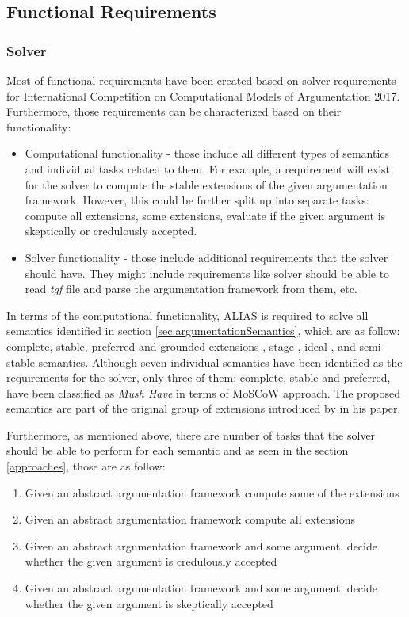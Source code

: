 \subsection{Functional Requirements}

\subsubsection{Solver}

Most of functional requirements have been created based on solver requirements for International Competition on Computational Models of Argumentation 2017. Furthermore, those requirements can be characterized based on their functionality:
\begin{itemize}
	\item Computational functionality - those include all different types of semantics and individual tasks related to them. For example, a requirement will exist for the solver to compute the stable extensions of the given argumentation framework. However, this could be further split up into separate tasks: compute all extensions, some extensions, evaluate if the given argument is skeptically or credulously accepted.
	\item Solver functionality - those include additional requirements that the solver should have. They might include requirements like solver should be able to read \textit{tgf} file and parse the argumentation framework from them, etc.
\end{itemize}

In terms of the computational functionality, ALIAS is required to solve all semantics identified in section \ref{sec:argumentationSemantics}, which are as follow: complete, stable, preferred and grounded extensions \citep{dung1995}, stage \citep{verheij1996two}, ideal \citep{dung2007computing}, and semi-stable \citep{caminada2006semi} semantics. Although seven individual semantics have been identified as the requirements for the solver, only three of them: complete, stable and preferred, have been classified as \textit{Mush Have} in terms of MoSCoW approach. The proposed semantics are part of the original group of extensions introduced by \citet{dung1995} in his paper. 

Furthermore, as mentioned above, there are number of tasks that the solver should be able to perform for each semantic and as seen in the section \ref{approaches}, those are as follow:
\begin{enumerate}
	\item Given an abstract argumentation framework compute some of the extensions
	\item Given an abstract argumentation framework compute all extensions
	\item Given an abstract argumentation framework and some argument, decide whether the given argument is credulously accepted
	\item Given an abstract argumentation framework and some argument, decide whether the given argument is skeptically accepted
\end{enumerate}

